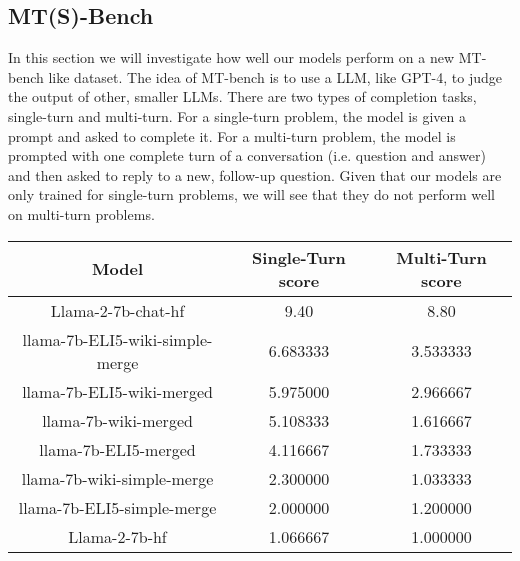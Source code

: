 \documentclass[11pt, oneside]{article}   	%
\begin{document}
\subsection{MT(S)-Bench}

In this section we will investigate how well our models perform on a new MT-bench like dataset.
The idea of MT-bench is to use a LLM, like GPT-4, to judge the output of other, smaller LLMs. 
There are two types of completion tasks, single-turn and multi-turn.
For a single-turn problem, the model is given a prompt and asked to complete it.
For a multi-turn problem, the model is prompted with one complete turn of a conversation (i.e. question and answer) and then asked to reply to a new, follow-up question. 
Given that our models are only trained for single-turn problems, we will see that they do not perform well on multi-turn problems.


\begin{center}
\begin{tabular}{c|c|c}
    \hline
    \textbf{Model} & \textbf{Single-Turn score}& \textbf{Multi-Turn score} \\
    \hline
    Llama-2-7b-chat-hf &  9.40 & 8.80\\ 
    llama-7b-ELI5-wiki-simple-merge & 6.683333 & 3.533333  \\
    llama-7b-ELI5-wiki-merged &  5.975000 &  2.966667 \\
    llama-7b-wiki-merged &  5.108333 & 1.616667  \\
    llama-7b-ELI5-merged &  4.116667 & 1.733333  \\
    llama-7b-wiki-simple-merge &  2.300000& 1.033333  \\
    llama-7b-ELI5-simple-merge & 2.000000 & 1.200000  \\
    Llama-2-7b-hf & 1.066667 &1.000000 \\
    \hline
\end{tabular}
\end{center}
\end{document}
